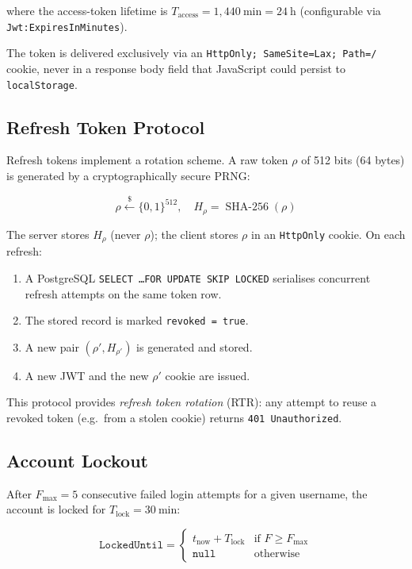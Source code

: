 \documentclass[12pt,a4paper]{article}
\theoremstyle{definition}
\theoremstyle{plain}
\theoremstyle{remark}
\newcommand{\SHA}{\operatorname{SHA\text{-}256}}
\begin{document}
where the access-token lifetime is $T_{\text{access}} = 1{,}440\ \mathrm{min}
= 24\ \mathrm{h}$ (configurable via \texttt{Jwt:ExpiresInMinutes}).

The token is delivered exclusively via an \texttt{HttpOnly; SameSite=Lax;
Path=/} cookie, never in a response body field that JavaScript could
persist to \texttt{localStorage}.

\subsection{Refresh Token Protocol}
\label{sec:refresh}

Refresh tokens implement a rotation scheme. A raw token $\rho$ of 512 bits
(64 bytes) is generated by a cryptographically secure PRNG:

\begin{equation}
  \rho \xleftarrow{\$} \{0,1\}^{512}, \quad
  H_\rho = \SHA(\rho)
  \label{eq:refresh_token}
\end{equation}

The server stores $H_\rho$ (never $\rho$); the client stores $\rho$ in an
\texttt{HttpOnly} cookie. On each refresh:

\begin{enumerate}
  \item A PostgreSQL \texttt{SELECT \ldots FOR UPDATE SKIP LOCKED}
    serialises concurrent refresh attempts on the same token row.
  \item The stored record is marked \texttt{revoked = true}.
  \item A new pair $(\rho', H_{\rho'})$ is generated and stored.
  \item A new JWT and the new $\rho'$ cookie are issued.
\end{enumerate}

This protocol provides \emph{refresh token rotation} (RTR): any attempt
to reuse a revoked token (e.g.\ from a stolen cookie) returns
\texttt{401 Unauthorized}.

\subsection{Account Lockout}
\label{sec:lockout}

After $F_{\max} = 5$ consecutive failed login attempts for a given username,
the account is locked for $T_{\text{lock}} = 30\ \mathrm{min}$:

\begin{equation}
  \texttt{LockedUntil} =
  \begin{cases}
    t_{\text{now}} + T_{\text{lock}} & \text{if } F \geq F_{\max} \\
    \texttt{null}                    & \text{otherwise}
  \end{cases}
  \label{eq:lockout}
\end{equation}
\end{document}
